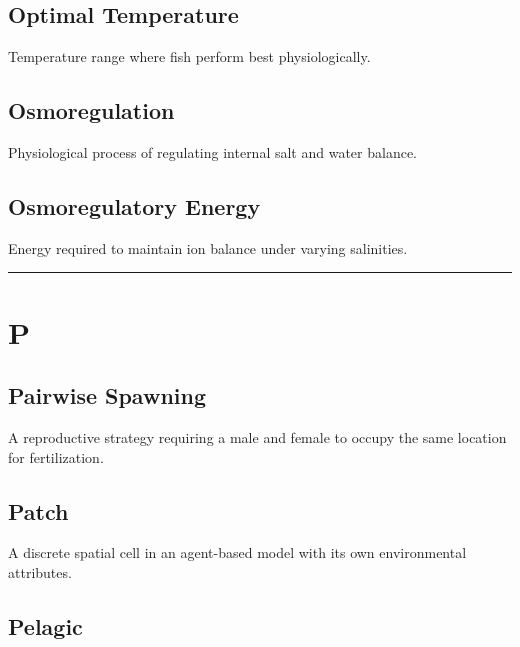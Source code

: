 \documentclass[
]{book}
\begin{document}
\subsection{\texorpdfstring{\textbf{Optimal Temperature}}{Optimal Temperature}}\label{optimal-temperature}

Temperature range where fish perform best physiologically.

\subsection{\texorpdfstring{\textbf{Osmoregulation}}{Osmoregulation}}\label{osmoregulation}

Physiological process of regulating internal salt and water balance.

\subsection{\texorpdfstring{\textbf{Osmoregulatory Energy}}{Osmoregulatory Energy}}\label{osmoregulatory-energy}

Energy required to maintain ion balance under varying salinities.

\begin{center}\rule{0.5\linewidth}{0.5pt}\end{center}

\section*{P}\label{p}

\subsection{\texorpdfstring{\textbf{Pairwise Spawning}}{Pairwise Spawning}}\label{pairwise-spawning}

A reproductive strategy requiring a male and female to occupy the same location for fertilization.

\subsection{\texorpdfstring{\textbf{Patch}}{Patch}}\label{patch}

A discrete spatial cell in an agent-based model with its own environmental attributes.

\subsection{\texorpdfstring{\textbf{Pelagic}}{Pelagic}}\label{pelagic}
\end{document}
